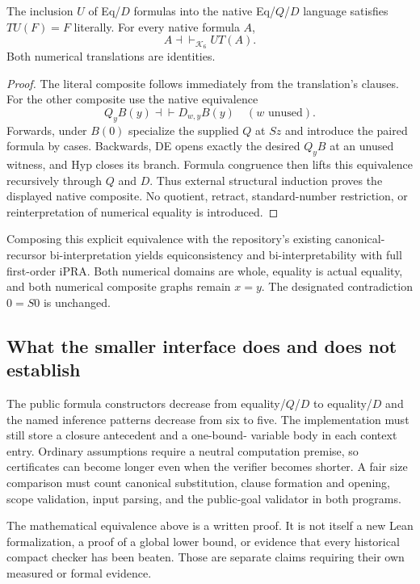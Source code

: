 \begin{theorem}
The inclusion $U$ of Eq/$D$ formulas into the native Eq/$Q$/$D$ language
satisfies $TU(F)=F$ literally. For every native formula $A$,
\[
 A\dashv\vdash_{\mathcal K_6}UT(A).
\]
Both numerical translations are identities.
\end{theorem}
\begin{proof}
The literal composite follows immediately from the translation's clauses.
For the other composite use the native equivalence
\[
 Q_yB(y)\dashv\vdash D_{w,y}B(y)\quad(w\text{ unused}).
\]
Forwards, under $B(0)$ specialize the supplied $Q$ at $Sz$ and introduce
the paired formula by cases. Backwards, DE opens exactly the desired
$Q_yB$ at an unused witness, and Hyp closes its branch. Formula congruence
then lifts this equivalence recursively through $Q$ and $D$. Thus
external structural induction proves the displayed native composite.
No quotient, retract, standard-number restriction, or reinterpretation
of numerical equality is introduced.
\end{proof}

Composing this explicit equivalence with the repository's existing
canonical-recursor bi-interpretation yields equiconsistency and
bi-interpretability with full first-order iPRA. Both numerical domains
are whole, equality is actual equality, and both numerical composite
graphs remain $x=y$. The designated contradiction $0=S0$ is unchanged.

\subsection{What the smaller interface does and does not establish}

The public formula constructors decrease from equality/$Q$/$D$ to
equality/$D$ and the named inference patterns decrease from six to five.
The implementation must still store a closure antecedent and a one-bound-
variable body in each context entry. Ordinary assumptions require a
neutral computation premise, so certificates can become longer even
when the verifier becomes shorter. A fair size comparison must count
canonical substitution, clause formation and opening, scope validation,
input parsing, and the public-goal validator in both programs.

The mathematical equivalence above is a written proof. It is not itself
a new Lean formalization, a proof of a global lower bound, or evidence
that every historical compact checker has been beaten. Those are
separate claims requiring their own measured or formal evidence.
